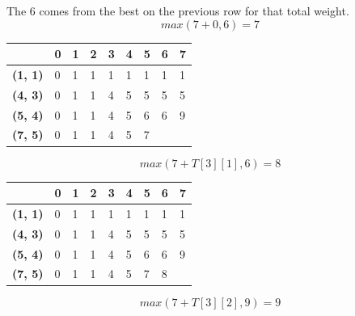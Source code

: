 \documentclass{article}
\begin{document}
The 6 comes from the best on the previous row for that total weight. 
$$max(7 + 0, 6) = 7$$
\begin{center}
\begin{tabular}{|l|l|l|l|l|l|l|l|l|}
\hline
                & \textbf{0} & \textbf{1} & \textbf{2} & \textbf{3} & \textbf{4} & \textbf{5} & \textbf{6} & \textbf{7} \\ \hline
\textbf{(1, 1)} & 0          &1            &1            &1            &1            &1            &1            &1            \\ \hline
\textbf{(4, 3)} & 0          &1            &1            &4            &5            &5            &  5          &  5          \\ \hline
\textbf{(5, 4)} & 0          &1            &1            &4            &5            &6            &6            & 9           \\ \hline
\textbf{(7, 5)} & 0          & 1           & 1           &   4         &   5         &7            &            &            \\ \hline
\end{tabular}
\end{center}
$$max(7 + T[3][1], 6) = 8$$
\begin{center}
\begin{tabular}{|l|l|l|l|l|l|l|l|l|}
\hline
                & \textbf{0} & \textbf{1} & \textbf{2} & \textbf{3} & \textbf{4} & \textbf{5} & \textbf{6} & \textbf{7} \\ \hline
\textbf{(1, 1)} & 0          &1            &1            &1            &1            &1            &1            &1            \\ \hline
\textbf{(4, 3)} & 0          &1            &1            &4            &5            &5            &  5          &  5          \\ \hline
\textbf{(5, 4)} & 0          &1            &1            &4            &5            &6            &6            & 9           \\ \hline
\textbf{(7, 5)} & 0          & 1           & 1           &   4         &   5         &7            & 8           &            \\ \hline
\end{tabular}
\end{center}
$$max(7+T[3][2], 9) = 9$$
\end{document}
